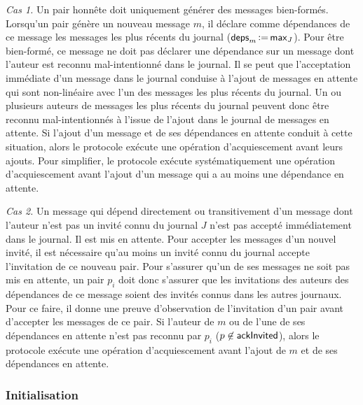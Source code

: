 \emph{Cas 1.} Un pair honnête doit uniquement générer des messages bien-formés.
Lorsqu'un pair génère un nouveau message $m$, il déclare comme dépendances de ce message les messages les plus récents du journal ($\operatorname{\mathsf{deps}}_m \operatorname{\vcentcolon=} \operatorname{\mathsf{max}}_J$).
Pour être bien-formé, ce message ne doit pas déclarer une dépendance sur un message dont l'auteur est reconnu mal-intentionné dans le journal.
Il se peut que l'acceptation immédiate d'un message dans le journal conduise à l'ajout de messages en attente qui sont non-linéaire avec l'un des messages les plus récents du journal.
Un ou plusieurs auteurs de messages les plus récents du journal peuvent donc être reconnu mal-intentionnés à l'issue de l'ajout dans le journal de messages en attente.
Si l'ajout d'un message et de ses dépendances en attente conduit à cette situation, alors le protocole exécute une opération d'acquiescement avant leurs ajouts.
Pour simplifier, le protocole exécute systématiquement une opération d'acquiescement avant l'ajout d'un message qui a au moins une dépendance en attente.


\emph{Cas 2.} Un message qui dépend directement ou transitivement d'un message dont l'auteur n'est pas un invité connu du journal $J$ n'est pas accepté immédiatement dans le journal.
Il est mis en attente.
Pour accepter les messages d'un nouvel invité, il est nécessaire qu'au moins un invité connu du journal accepte l'invitation de ce nouveau pair.
Pour s'assurer qu'un de ses messages ne soit pas mis en attente, un pair $p_i$ doit donc s'assurer que les invitations des auteurs des dépendances de ce message soient des invités connus dans les autres journaux.
Pour ce faire, il donne une preuve d'observation de l'invitation d'un pair avant d'accepter les messages de ce pair.
Si l'auteur de $m$ ou de l'une de ses dépendances en attente n'est pas reconnu par $p_i$ ($p \not\in \operatorname{\mathsf{ackInvited}}$), alors le protocole exécute une opération d'acquiescement avant l'ajout de $m$ et de ses dépendances en attente.


\subsubsection{Initialisation}

